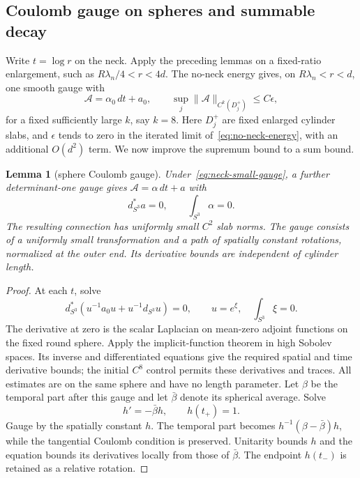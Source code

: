 \documentclass[11pt]{amsart}
\newtheorem{lemma}[theorem]{Lemma}
\theoremstyle{definition}
\theoremstyle{remark}
\theoremstyle{plain}
\begin{document}
\subsection{Coulomb gauge on spheres and summable decay}
Write $t=\log r$ on the neck.  Apply the preceding lemmas on a
fixed-ratio enlargement, such as $R\lambda_n/4<r<4d$.
The no-neck energy gives, on $R\lambda_n<r<d$, one smooth gauge with
\begin{equation}\label{eq:neck-small-gauge}
 \mathcal A=\alpha_0\,dt+a_0,\qquad
 \sup_j\|\mathcal A\|_{C^k(D_j^+)}\le C\epsilon,
\end{equation}
for a fixed sufficiently large $k$, say $k=8$.  Here $D_j^+$ are
fixed enlarged cylinder slabs, and $\epsilon$ tends to zero in the
iterated limit of~\eqref{eq:no-neck-energy}, with an additional
$O(d^2)$ term.  We now improve the supremum bound to a sum bound.

\begin{lemma}[sphere Coulomb gauge]\label{lem:sphere-coulomb}
Under~\eqref{eq:neck-small-gauge}, a further determinant-one gauge
gives $\mathcal A=\alpha\,dt+a$ with
\begin{equation}\label{eq:sphere-coulomb}
 d_{S^3}^*a=0,\qquad \int_{S^3}\alpha=0.
\end{equation}
The resulting connection has uniformly small $C^2$ slab norms.
The gauge consists of a uniformly small transformation and a path
of spatially constant rotations, normalized at the outer end.
Its derivative bounds are independent of cylinder length.
\end{lemma}
\begin{proof}
At each $t$, solve
\[
 d_{S^3}^*(u^{-1}a_0u+u^{-1}d_{S^3}u)=0,
 \qquad u=e^\xi,\quad\int_{S^3}\xi=0.
\]
The derivative at zero is the scalar Laplacian on mean-zero adjoint
functions on the fixed round sphere.  Apply the implicit-function
theorem in high Sobolev spaces.  Its inverse and differentiated
equations give the required spatial and time derivative bounds;
the initial $C^8$ control permits these derivatives and traces.
All estimates are on the same sphere and have no length parameter.
Let $\beta$ be the temporal part after this gauge and let
$\bar\beta$ denote its spherical average.  Solve
\[
 h'=-\bar\beta h,\qquad h(t_+)=1.
\]
Gauge by the spatially constant $h$.  The temporal part becomes
$h^{-1}(\beta-\bar\beta)h$, while the tangential Coulomb condition
is preserved.  Unitarity bounds $h$ and the equation bounds its
derivatives locally from those of $\bar\beta$.  The endpoint
$h(t_-)$ is retained as a relative rotation.
\end{proof}
\end{document}
